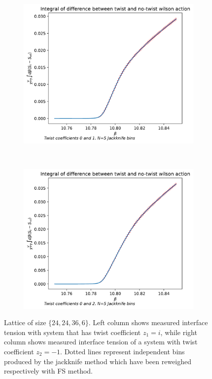 \documentclass[english,twoside,openright]{UH_TCM_MSc}
\begin{document}
\begin{figure}[htpb]
    \begin{subfigure}[t]{0.5\textwidth}
        \centering
        \includegraphics[width=\textwidth]{final_plots/24_24_36_highlight/action_diff_int_0-1.pdf}
        \caption{}
    \end{subfigure}%
    ~ 
    \begin{subfigure}[t]{0.5\textwidth}
        \centering
        \includegraphics[width=\textwidth]{final_plots/24_24_36_highlight/action_diff_int_0-2.pdf}
        \caption{}
    \end{subfigure}
    \label{fig:2424366}
    \caption{Lattice of size $\{24,24,36,6\}$. Left column shows measured interface tension with system that has twist coefficient $z_1 = i$, while right column shows measured interface tension of a system with twist coefficient $z_2 = -1$. Dotted lines represent independent bins produced by the jackknife method which have been reweighed respectively with FS method.} 
\end{figure}
\end{document}
